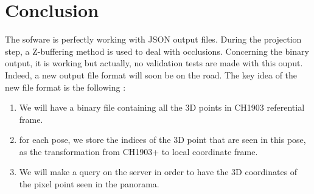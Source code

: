 \documentclass[a4paper, 11pt]{article}
\begin{document}
\section*{Conclusion}
  The sofware is perfectly working with JSON output files. During the projection step, a Z-buffering method is used to
  deal with occlusions. Concerning the binary output, it is working but actually, no
  validation tests are made with this ouput. Indeed, a new output file format will soon be on the road. The key idea of the
  new file format is the following :
  \begin{enumerate}
      \item We will have a binary file containing all the 3D points in CH1903 referential frame.
      \item for each pose, we store the indices of the 3D point that are seen in this pose, as the transformation
            from CH1903+ to local coordinate frame.
      \item We will make a query on the server in order to have the 3D coordinates of the pixel point seen in the panorama.
  \end{enumerate}
\end{document}
